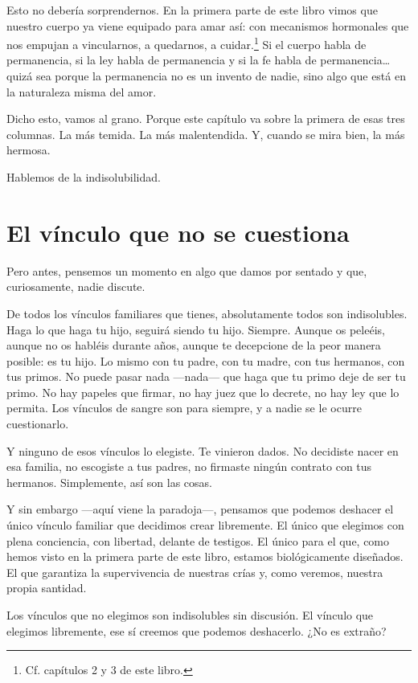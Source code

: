 Esto no debería sorprendernos. En la primera parte de este libro vimos que nuestro cuerpo ya viene equipado para amar así: con mecanismos hormonales que nos empujan a vincularnos, a quedarnos, a cuidar.\footnote{Cf. capítulos 2 y 3 de este libro.} Si el cuerpo habla de permanencia, si la ley habla de permanencia y si la fe habla de permanencia\ldots{} quizá sea porque la permanencia no es un invento de nadie, sino algo que está en la naturaleza misma del amor.

Dicho esto, vamos al grano. Porque este capítulo va sobre la primera de esas tres columnas. La más temida. La más malentendida. Y, cuando se mira bien, la más hermosa.

Hablemos de la indisolubilidad.

\section{El vínculo que no se cuestiona}

Pero antes, pensemos un momento en algo que damos por sentado y que, curiosamente, nadie discute.

De todos los vínculos familiares que tienes, absolutamente todos son indisolubles. Haga lo que haga tu hijo, seguirá siendo tu hijo. Siempre. Aunque os peleéis, aunque no os habléis durante años, aunque te decepcione de la peor manera posible: es tu hijo. Lo mismo con tu padre, con tu madre, con tus hermanos, con tus primos. No puede pasar nada ---nada--- que haga que tu primo deje de ser tu primo. No hay papeles que firmar, no hay juez que lo decrete, no hay ley que lo permita. Los vínculos de sangre son para siempre, y a nadie se le ocurre cuestionarlo.

Y ninguno de esos vínculos lo elegiste. Te vinieron dados. No decidiste nacer en esa familia, no escogiste a tus padres, no firmaste ningún contrato con tus hermanos. Simplemente, así son las cosas.

Y sin embargo ---aquí viene la paradoja---, pensamos que podemos deshacer el único vínculo familiar que decidimos crear libremente. El único que elegimos con plena conciencia, con libertad, delante de testigos. El único para el que, como hemos visto en la primera parte de este libro, estamos biológicamente diseñados. El que garantiza la supervivencia de nuestras crías y, como veremos, nuestra propia santidad.

Los vínculos que no elegimos son indisolubles sin discusión. El vínculo que elegimos libremente, ese sí creemos que podemos deshacerlo. ¿No es extraño?

